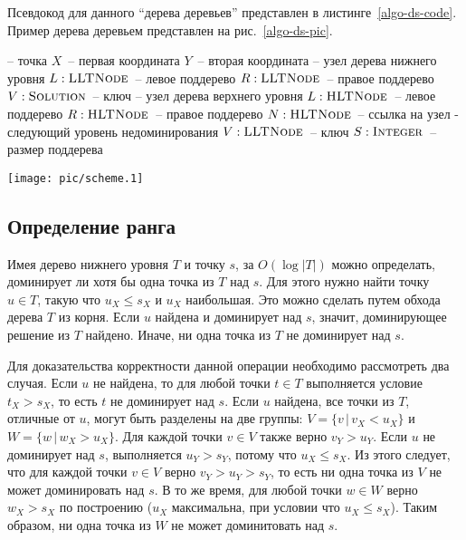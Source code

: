 Псевдокод для данного ``дерева деревьев'' представлен в листинге~\ref{algo-ds-code}.
Пример дерева деревьем представлен на рис.~\ref{algo-ds-pic}.
\begin{algorithm}[H]
\begin{algorithmic}[1]
    \State -- точка
    \State $X$~-- первая координата
    \State $Y$~-- вторая координата
\EndStructure
{}
    \State -- узел дерева нижнего уровня
    \State $L: \textsc{LLTNode}$~-- левое поддерево
    \State $R: \textsc{LLTNode}$~-- правое поддерево
    \State $V: \textsc{Solution}$~-- ключ
\EndStructure
{}
    \State -- узел дерева верхнего уровня
    \State $L: \textsc{HLTNode}$~-- левое поддерево
    \State $R: \textsc{HLTNode}$~-- правое поддерево
    \State $N: \textsc{HLTNode}$~-- ссылка на узел - следующий уровень недоминирования
    \State $V: \textsc{LLTNode}$~-- ключ
    \State $S: \textsc{Integer}$~-- размер поддерева
\EndStructure
\end{algorithmic}
\caption{Псевдокод структур данных, используемых в разработанном алгоритме}\label{algo-ds-code}
\end{algorithm}

\begin{figure*}[!t]
\centering
\texttt{[image: pic/scheme.1]}
\caption{
Предложенная структура данных~-- ``дерево деревьев''. 
Узлы ``дерева верхнего уровня'' соответствуют уровням недоминирования.
Каждый уровень недоминирования представлен в виде ``дерева нижнего уровня'',
узлы которого упорядочены по первой координате. В каждом узле ``дерева верхнего уровня'' 
дополнительно хранится размер поддерева (на рисунке - числа в скобках).
}\label{algo-ds-pic}
\end{figure*}

\subsection{Определение ранга}
\label{algo-lookup}
Имея дерево нижнего уровня $T$ и точку $s$, за $O(\log |T|)$ можно определать, доминирует ли 
хотя бы одна точка из $T$ над $s$. Для этого нужно найти точку $u \in T$, такую что 
$u_X \le s_X$ и $u_X$ наибольшая. Это можно сделать путем обхода дерева $T$ из корня. Если
$u$ найдена и доминирует над $s$, значит, доминирующее решение из $T$ найдено. Иначе,
ни одна точка из $T$ не доминирует над $s$.

Для доказательства корректности данной операции необходимо рассмотреть два случая. Если $u$ не найдена, 
то для любой точки $t \in T$ выполняется условие $t_X > s_X$, то есть $t$ не доминирует над $s$.
Если $u$ найдена, все точки из $T$, отличные от $u$, могут быть разделены на две группы: 
$V = \{ v\,|\,v_X < u_X \}$ и $W = \{ w\,|\,w_X > u_X \}$.
Для каждой точки $v \in V$ также верно $v_Y > u_Y$. Если $u$ не доминирует над $s$, 
выполняется $u_Y > s_Y$, потому что $u_X \le s_X$. Из этого следует, что для каждой точки 
$v \in V$ верно $v_Y > u_Y > s_Y$, то есть ни одна точка из $V$ не может доминировать над $s$. 
В то же время, для любой точки $w \in W$ верно $w_X > s_X$ по построению ($u_X$ максимальна,
при условии что $u_X \le s_X$). Таким образом, ни одна точка из $W$ не может доминитовать над $s$.

